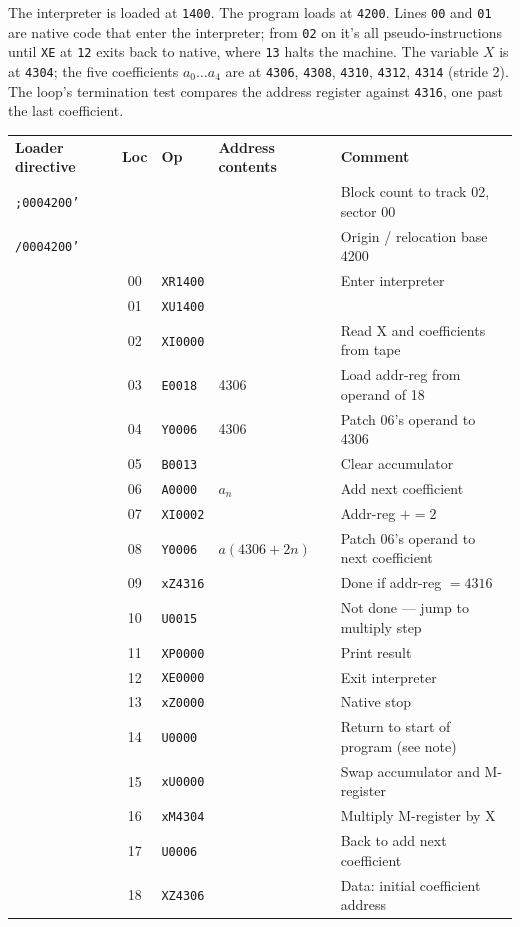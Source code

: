 The interpreter is loaded at \texttt{1400}. The program loads at \texttt{4200}. Lines \texttt{00} and \texttt{01} are native code that enter the interpreter; from \texttt{02} on it's all pseudo-instructions until \texttt{XE} at \texttt{12} exits back to native, where \texttt{13} halts the machine. The variable $X$ is at \texttt{4304}; the five coefficients $a_0 \ldots a_4$ are at \texttt{4306}, \texttt{4308}, \texttt{4310}, \texttt{4312}, \texttt{4314} (stride 2). The loop's termination test compares the address register against \texttt{4316}, one past the last coefficient.

\medskip
\noindent
\small
\ttfamily
\begin{tabular}{l|c|l|l|l}
\textbf{Loader directive} & \textbf{Loc} & \textbf{Op} & \textbf{Address contents} & \textbf{Comment} \\
\texttt{;0004200'} &    &           &        & Block count to track 02, sector 00 \\
\texttt{/0004200'} &    &           &        & Origin / relocation base 4200 \\
           & 00 & \texttt{XR1400}  &        & Enter interpreter \\
           & 01 & \texttt{XU1400}  &        & \\
           & 02 & \texttt{XI0000}  &        & Read X and coefficients from tape \\
           & 03 & \texttt{E0018}   & 4306   & Load addr-reg from operand of 18 \\
           & 04 & \texttt{Y0006}   & 4306   & Patch 06's operand to 4306 \\
           & 05 & \texttt{B0013}   &        & Clear accumulator \\
           & 06 & \texttt{A0000}   & $a_n$  & Add next coefficient \\
           & 07 & \texttt{XI0002}  &        & Addr-reg $+= 2$ \\
           & 08 & \texttt{Y0006}   & $a(4306+2n)$ & Patch 06's operand to next coefficient \\
           & 09 & \texttt{xZ4316}  &        & Done if addr-reg $= 4316$ \\
           & 10 & \texttt{U0015}   &        & Not done --- jump to multiply step \\
           & 11 & \texttt{XP0000}  &        & Print result \\
           & 12 & \texttt{XE0000}  &        & Exit interpreter \\
           & 13 & \texttt{xZ0000}  &        & Native stop \\
           & 14 & \texttt{U0000}   &        & Return to start of program (see note) \\
           & 15 & \texttt{xU0000}  &        & Swap accumulator and M-register \\
           & 16 & \texttt{xM4304}  &        & Multiply M-register by X \\
           & 17 & \texttt{U0006}   &        & Back to add next coefficient \\
           & 18 & \texttt{XZ4306}  &        & Data: initial coefficient address \\
\end{tabular}
\normalsize

